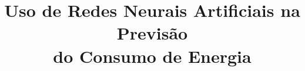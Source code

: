 





\title{\textsf{
\bfseries \Huge Uso de Redes Neurais Artificiais na Previsão\\ 
do Consumo de Energia}}














